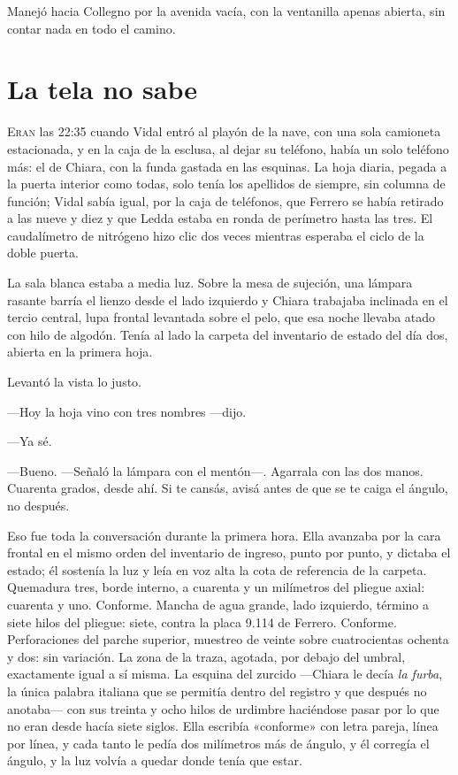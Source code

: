 Manejó hacia Collegno por la avenida vacía, con la ventanilla apenas abierta, sin contar nada en todo el camino.

\clearpage

\chapter{La tela no sabe}

\lettrine[lines=2, lhang=0.1, nindent=0.2em]{E}{ran} las 22:35 cuando Vidal entró al playón de la nave, con una sola camioneta estacionada, y en la caja de la esclusa, al dejar su teléfono, había un solo teléfono más: el de Chiara, con la funda gastada en las esquinas. La hoja diaria, pegada a la puerta interior como todas, solo tenía los apellidos de siempre, sin columna de función; Vidal sabía igual, por la caja de teléfonos, que Ferrero se había retirado a las nueve y diez y que Ledda estaba en ronda de perímetro hasta las tres. El caudalímetro de nitrógeno hizo clic dos veces mientras esperaba el ciclo de la doble puerta.


La sala blanca estaba a media luz. Sobre la mesa de sujeción, una lámpara rasante barría el lienzo desde el lado izquierdo y Chiara trabajaba inclinada en el tercio central, lupa frontal levantada sobre el pelo, que esa noche llevaba atado con hilo de algodón. Tenía al lado la carpeta del inventario de estado del día dos, abierta en la primera hoja.

Levantó la vista lo justo.

---Hoy la hoja vino con tres nombres ---dijo.

---Ya sé.

---Bueno. ---Señaló la lámpara con el mentón---. Agarrala con las dos manos. Cuarenta grados, desde ahí. Si te cansás, avisá antes de que se te caiga el ángulo, no después.

Eso fue toda la conversación durante la primera hora. Ella avanzaba por la cara frontal en el mismo orden del inventario de ingreso, punto por punto, y dictaba el estado; él sostenía la luz y leía en voz alta la cota de referencia de la carpeta. Quemadura tres, borde interno, a cuarenta y un milímetros del pliegue axial: cuarenta y uno. Conforme. Mancha de agua grande, lado izquierdo, término a siete hilos del pliegue: siete, contra la placa 9.114 de Ferrero. Conforme. Perforaciones del parche superior, muestreo de veinte sobre cuatrocientas ochenta y dos: sin variación. La zona de la traza, agotada, por debajo del umbral, exactamente igual a sí misma. La esquina del zurcido ---Chiara le decía \textit{la furba}, la única palabra italiana que se permitía dentro del registro y que después no anotaba--- con sus treinta y ocho hilos de urdimbre haciéndose pasar por lo que no eran desde hacía siete siglos. Ella escribía «conforme» con letra pareja, línea por línea, y cada tanto le pedía dos milímetros más de ángulo, y él corregía el ángulo, y la luz volvía a quedar donde tenía que estar.


